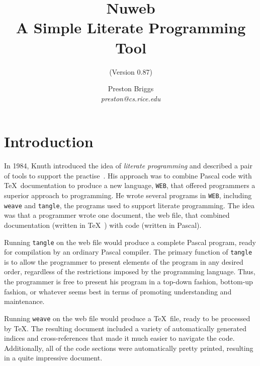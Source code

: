 
\setlength{\oddsidemargin}{0in}
\setlength{\evensidemargin}{0in}
\setlength{\topmargin}{0in}
\addtolength{\topmargin}{-\headheight}
\addtolength{\topmargin}{-\headsep}
\setlength{\textheight}{8.9in}
\setlength{\textwidth}{6.5in}
\setlength{\marginparwidth}{0.5in}

\title{Nuweb \\ A Simple Literate Programming Tool}
\date{Preston Briggs \\ \sl preston@cs.rice.edu}
\author{(Version 0.87)}


\maketitle

\section{Introduction}

In 1984, Knuth introduced the idea of {\em literate programming\/} and
described a pair of tools to support the practise~\cite{knuth:84}.
His approach was to combine Pascal code with \TeX\ documentation to
produce a new language, \verb|WEB|, that offered programmers a superior
approach to programming. He wrote several programs in \verb|WEB|,
including \verb|weave| and \verb|tangle|, the programs used to support
literate programming.
The idea was that a programmer wrote one document, the web file, that
combined documentation (written in \TeX~\cite{texbook}) with code
(written in Pascal).

Running \verb|tangle| on the web file would produce a complete
Pascal program, ready for compilation by an ordinary Pascal compiler.
The primary function of \verb|tangle| is to allow the programmer to
present elements of the program in any desired order, regardless of
the restrictions imposed by the programming language. Thus, the
programmer is free to present his program in a top-down fashion,
bottom-up fashion, or whatever seems best in terms of promoting
understanding and maintenance.

Running \verb|weave| on the web file would produce a \TeX\ file, ready
to be processed by \TeX\@. The resulting document included a variety of
automatically generated indices and cross-references that made it much
easier to navigate the code. Additionally, all of the code sections
were automatically pretty printed, resulting in a quite impressive
document. 

